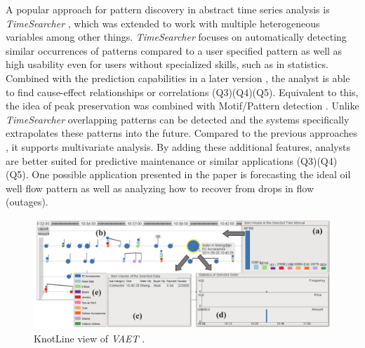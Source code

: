 \documentclass[electronic]{vgtc}             %
\begin{document}
A popular approach for pattern discovery in abstract time series analysis is \textit{TimeSearcher} \cite{Hochheiser:2004}, which was extended \cite{buono:2005} to work with multiple heterogeneous variables among other things.
\textit{TimeSearcher} focuses on automatically detecting similar occurrences of patterns compared to a user specified pattern as well as high usability even for users without specialized skills, such as in statistics.
Combined with the prediction capabilities in a later version \cite{buono:2007}, the analyst is able to find cause-effect relationships or correlations (Q3)(Q4)(Q5).
Equivalent to this, the idea of peak preservation \cite{Hao:2009, Hao:2011} was combined with Motif/Pattern detection \cite{Hao:2012}.
Unlike \textit{TimeSearcher} \cite{buono:2007} overlapping patterns can be detected and the systems specifically extrapolates these patterns into the future.
Compared to the previous approaches \cite{Hao:2009, Hao:2011}, it supports multivariate analysis. 
By adding these additional features, analysts are better suited for predictive maintenance or similar applications (Q3)(Q4)(Q5). 
One possible application presented in the paper is forecasting the ideal oil well flow pattern as well as analyzing how to recover from drops in flow (outages).   

\begin{figure}[b]
	\centering
	\includegraphics[width=\columnwidth]{KnotLines}
	\caption{KnotLine view of \textit{VAET} \cite{Xie:2014}. 
	}
	\label{fig:knotlines}
\end{figure}
\end{document}
